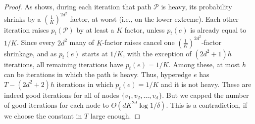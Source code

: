 \documentclass[11pt]{article}
\begin{document}
\begin{proof}
As  shows, during each iteration that path $\mathcal{P}$ is heavy, its probability shrinks by a $(\frac{1}{K})^{2d^2}$ factor, at worst (i.e., on the lower extreme). Each other iteration raises $p_{t}(\mathcal{P})$ by at least a $K$ factor, unless $p_{t}(e)$ is already equal to $1/K$. Since every $2d^2$ many of $K$-factor raises cancel one $(\frac{1}{K})^{2d^2}$-factor shrinkage, and as $p_{t}(e)$ starts at $1/K$, with the exception of $(2d^2+1)h$ iterations, all remaining iterations have $p_{t}(e)=1/K$. Among these, at most $h$ can be iterations in which the path is heavy. Thus, hyperedge $e$ has $T-(2d^2+2)h$ iterations in which $p_{t}(e)=1/K$ and it is not heavy. These are indeed good iterations for all of nodes $\{v_1, v_2, \dots, v_d\}$. But we capped the number of good iterations for each node to $\Theta(dK^{2d} \log 1/\delta)$. This is a contradiction, if we choose the constant in $T$ large enough.
\end{proof}
\end{document}
